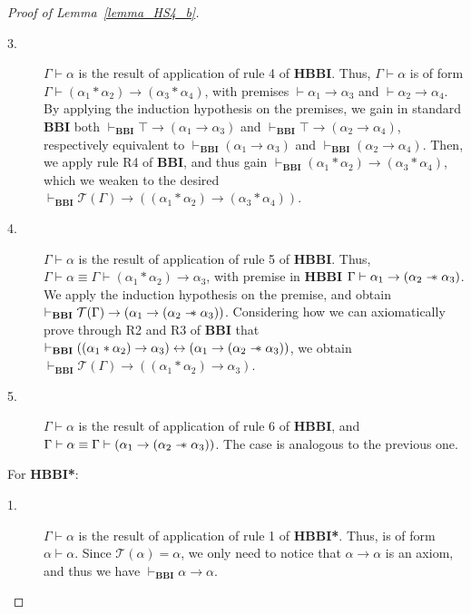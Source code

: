 \documentclass[a4paper]{article}
\newcommand\magicwand{\mathrel{-\mkern-6mu*}}
\newcommand{\BBI}{\textbf{BBI}\xspace}
\begin{document}
\begin{proof}[Proof of Lemma~\ref{lemma_HS4_b}]
\begin{description}
    \item[3.] $\Gamma \vdash \alpha$ is the result of application of rule 4 of \textbf{HBBI}. Thus, $\Gamma \vdash \alpha$ is of form $\Gamma \vdash (\alpha_1 * \alpha_2) \rightarrow (\alpha_3 * \alpha_4)$, with premises $\vdash \alpha_1 \rightarrow \alpha_3$ and $\vdash \alpha_2 \rightarrow \alpha_4$. By applying the induction hypothesis on the premises, we gain in standard \BBI both $\vdash_{\BBI}\top \rightarrow (\alpha_1 \rightarrow \alpha_3)$ and $\vdash_{\BBI}\top \rightarrow (\alpha_2 \rightarrow \alpha_4)$, respectively equivalent to $\vdash_{\BBI}(\alpha_1 \rightarrow \alpha_3)$ and $\vdash_{\BBI}(\alpha_2 \rightarrow \alpha_4)$. Then, we apply rule R4 of \BBI, and thus gain $\vdash_{\BBI}(\alpha_1 * \alpha_2)\rightarrow(\alpha_3 * \alpha_4)$, which we weaken to the desired $\vdash_{\BBI}\mathcal{T}(\Gamma)\rightarrow ((\alpha_1 * \alpha_2)\rightarrow(\alpha_3 * \alpha_4))$. 


    \item[4.] $\Gamma \vdash \alpha$ is the result of application of rule 5 of \textbf{HBBI}. Thus, $\Gamma \vdash \alpha \equiv \Gamma \vdash (\alpha_1 * \alpha_2) \rightarrow \alpha_3$, with premise in \textbf{HBBI} $\Gamma \vdash \alpha_1 \rightarrow (\alpha_2 \magicwand \alpha_3)$. We apply the induction hypothesis on the premise, and obtain $\vdash_{\BBI}\mathcal{T}(\Gamma) \rightarrow (\alpha_1 \rightarrow (\alpha_2 \magicwand \alpha_3))$. Considering how we can axiomatically prove through R2 and R3 of \BBI that $\vdash_{\BBI}((\alpha_1 * \alpha_2) \rightarrow \alpha_3) \leftrightarrow (\alpha_1 \rightarrow (\alpha_2 \magicwand \alpha_3))$, we obtain $\vdash_{\BBI}\mathcal{T}(\Gamma) \rightarrow ((\alpha_1 * \alpha_2) \rightarrow \alpha_3)$.

    \item[5.] $\Gamma \vdash \alpha$ is the result of application of rule 6 of \textbf{HBBI}, and $\Gamma \vdash \alpha \equiv \Gamma \vdash (\alpha_1 \rightarrow (\alpha_2 \magicwand \alpha_3))$. The case is analogous to the previous one.

    

    

    
\end{description}

\item[]For \textbf{HBBI*}: 


\begin{description}

    \item[1.] $\Gamma \vdash \alpha$ is the result of application of rule 1 of \textbf{HBBI*}. Thus, is of form $\alpha \vdash \alpha$. Since $\mathcal{T}(\alpha)= \alpha$, we only need to notice that $\alpha \rightarrow \alpha$ is an axiom, and thus we have $\vdash_{\BBI}\alpha \rightarrow \alpha$.


\end{description}
\end{proof}
\end{document}
